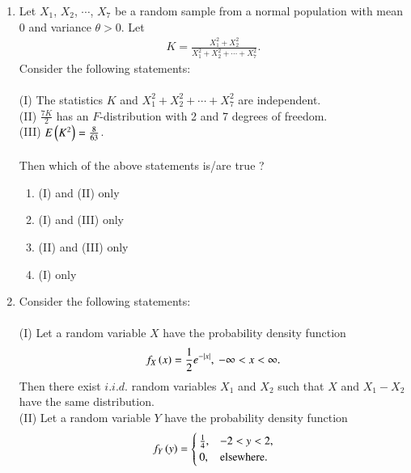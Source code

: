 \documentclass[journal]{IEEEtran}
\begin{document}
\begin{enumerate}
\begin{enumerate}
    \item {}
    \item {} 
    \item {}
    \item {} \\
\end{enumerate}
\item Let $X_1$, $X_2$, $\cdots$, $X_7$ be a random sample from a normal population with mean 0 and variance $\theta > 0$. Let
\begin{align*}
    K = \frac{X_1^2 + X_2^2}{X_1^2 + X_2^2 + \cdots + X_7^2}.
\end{align*}
Consider the following statements:\\\\
(I) The statistics $K$ and $X_1^2 + X_2^2 + \cdots + X_7^2$ are independent.\\
(II) $\frac{7K}{2}$ has an $F$-distribution with 2 and 7 degrees of freedom.\\
(III) $E\left(K^2\right) = \frac{8}{63}$. \\\\
Then which of the above statements is/are true ?
\begin{enumerate}
    \item (I) and (II) only
    \item (I) and (III) only
    \item (II) and (III) only
    \item (I) only \\
\end{enumerate}
\item Consider the following statements:\\\\
(I) Let a random variable $X$ have the probability density function
\begin{align*}
    f_X\left(x\right) = \frac{1}{2}e^{-\left\vert x\right\vert},\ -\infty < x < \infty.
\end{align*}
Then there exist $i.i.d.$ random variables $X_1$ and $X_2$ such that $X$ and
$X_1 - X_2$ have the same distribution.\\ 
(II) Let a random variable $Y$ have the probability density function 
\begin{align*}
    f_Y\left(y\right) = \begin{cases}
        \frac{1}{4}, & -2 < y < 2, \\
        0, & \text{elsewhere}.

\end{cases}
\end{align*}
\end{enumerate}
\end{document}
